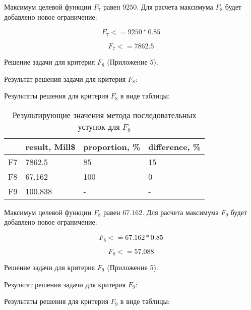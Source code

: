 Максимум целевой функции $F_7$ равен $9250$. Для расчета максимума $F_8$ будет добавлено новое ограничение:

\begin{equation*}
\text{$F_7<=9250*0.85$}
\end{equation*}

\begin{equation*}
\text{$F_7<=7862.5$}
\end{equation*}

Решение задачи для критерия $F_8$ (Приложение 5).

Результат решения задачи для критерия $F_8$:



Результаты решения для критерия $F_8$ в виде таблицы:

\begin{table}[h!]
	\centering
	\bgroup
	\captionsetup{singlelinecheck = false, format= hang, justification=raggedleft, font=footnotesize, labelsep=space}
	\caption{Результирующие значения метода последовательных уступок для $F_8$}
	\def\arraystretch{1}
	\begin{tabular}{ | m{1.2cm} | m{1.9cm} | m{2.2cm} | m{2.2cm} | }
		\hline
		& result, Mill\$ & proportion, \% & difference, \% \\ \hline
		F7 & 7862.5 & 85 & 15 \\ \hline
		F8 & 67.162 & 100 & 0 \\ \hline
		F9 & 100.838 & - & - \\
		\hline
	\end{tabular}
	\egroup
\end{table}

Максимум целевой функции $F_8$ равен $67.162$. Для расчета максимума $F_9$ будет добавлено новое ограничение:

\begin{equation*}
\text{$F_8<=67.162*0.85$}
\end{equation*}

\begin{equation*}
\text{$F_8<=57.088$}
\end{equation*}

Решение задачи для критерия $F_9$ (Приложение 5).

Результат решения задачи для критерия $F_9$:



Результаты решения для критерия $F_9$ в виде таблицы:

